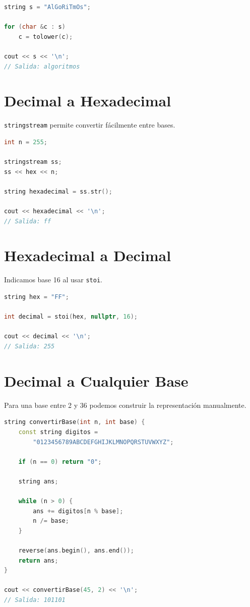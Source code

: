\documentclass[10pt,twocolumn,letterpaper]{report}
\begin{document}
\begin{lstlisting}[language=C++]
string s = "AlGoRiTmOs";

for (char &c : s)
    c = tolower(c);

cout << s << '\n';
// Salida: algoritmos
\end{lstlisting}

\section{Decimal a Hexadecimal}
\texttt{stringstream} permite convertir fácilmente entre bases.

\begin{lstlisting}[language=C++]
int n = 255;

stringstream ss;
ss << hex << n;

string hexadecimal = ss.str();

cout << hexadecimal << '\n';
// Salida: ff
\end{lstlisting}

\section{Hexadecimal a Decimal}
Indicamos base 16 al usar \texttt{stoi}.

\begin{lstlisting}[language=C++]
string hex = "FF";

int decimal = stoi(hex, nullptr, 16);

cout << decimal << '\n';
// Salida: 255
\end{lstlisting}

\section{Decimal a Cualquier Base}
Para una base entre 2 y 36 podemos construir la representación manualmente.

\begin{lstlisting}[language=C++]
string convertirBase(int n, int base) {
    const string digitos =
        "0123456789ABCDEFGHIJKLMNOPQRSTUVWXYZ";

    if (n == 0) return "0";

    string ans;

    while (n > 0) {
        ans += digitos[n % base];
        n /= base;
    }

    reverse(ans.begin(), ans.end());
    return ans;
}

cout << convertirBase(45, 2) << '\n';
// Salida: 101101
\end{lstlisting}
\end{document}
